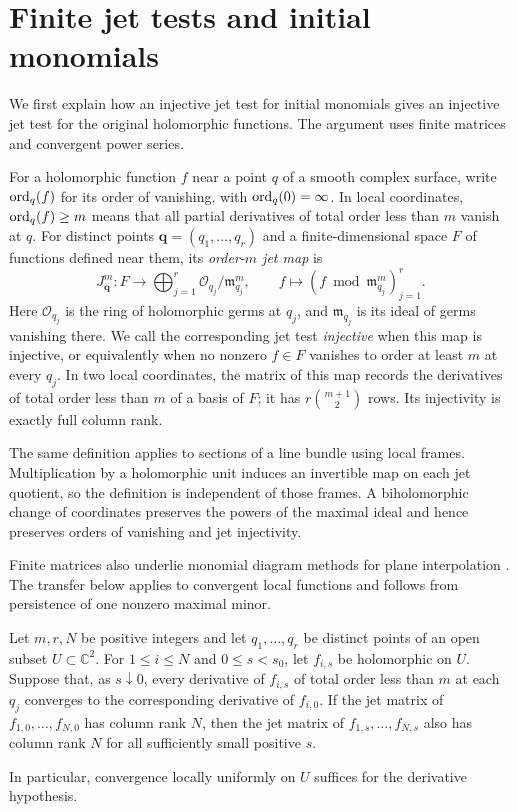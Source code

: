 \section{Finite jet tests and initial monomials}\label{sec:jets}

We first explain how an injective jet test for initial monomials gives an injective jet test for the original holomorphic functions.  The argument uses finite matrices and convergent power series.

For a holomorphic function $f$ near a point $q$ of a smooth complex surface, write $\operatorname{ord}_q(f)$ for its order of vanishing, with $\operatorname{ord}_q(0)=\infty$. In local coordinates, $\operatorname{ord}_q(f)\ge m$ means that all partial derivatives of total order less than $m$ vanish at $q$.  For distinct points $\boldsymbol q=(q_1,\ldots,q_r)$ and a finite-dimensional space $F$ of functions defined near them, its \emph{order-$m$ jet map} is
\[
 J^m_{\boldsymbol q}\colon F\longrightarrow
 \bigoplus_{j=1}^r\mathcal{O}_{q_j}/\mathfrak{m}_{q_j}^{m},
 \qquad f\longmapsto (f\bmod\mathfrak{m}_{q_j}^{m})_{j=1}^r.
\]
Here $\mathcal{O}_{q_j}$ is the ring of holomorphic germs at $q_j$, and $\mathfrak{m}_{q_j}$ is its ideal of germs vanishing there.  We call the corresponding jet test \emph{injective} when this map is injective, or equivalently when no nonzero $f\in F$ vanishes to order at least $m$ at every $q_j$.  In two local coordinates, the matrix of this map records the derivatives of total order less than $m$ of a basis of $F$; it has $r\binom{m+1}{2}$ rows.  Its injectivity is exactly full column rank.

The same definition applies to sections of a line bundle using local frames.  Multiplication by a holomorphic unit induces an invertible map on each jet quotient, so the definition is independent of those frames. A biholomorphic change of coordinates preserves the powers of the maximal ideal and hence preserves orders of vanishing and jet injectivity.

Finite matrices also underlie monomial diagram methods for plane interpolation \cite[Propositions~10 and~13]{Dumnicki2007}. The transfer below applies to convergent local functions and follows from persistence of one nonzero maximal minor.

\begin{lemma}\label{lem:rank-persistence}
Let $m,r,N$ be positive integers and let $q_1,\ldots,q_r$ be distinct points of an open subset $U\subset\mathbb{C}^2$.  For $1\le i\le N$ and $0\le s<s_0$, let $f_{i,s}$ be holomorphic on $U$.  Suppose that, as $s\downarrow0$, every derivative of $f_{i,s}$ of total order less than $m$ at each $q_j$ converges to the corresponding derivative of $f_{i,0}$. If the jet matrix of $f_{1,0},\ldots,f_{N,0}$ has column rank $N$, then the jet matrix of $f_{1,s},\ldots,f_{N,s}$ also has column rank $N$ for all sufficiently small positive $s$.

In particular, convergence locally uniformly on $U$ suffices for the derivative hypothesis.
\end{lemma}

